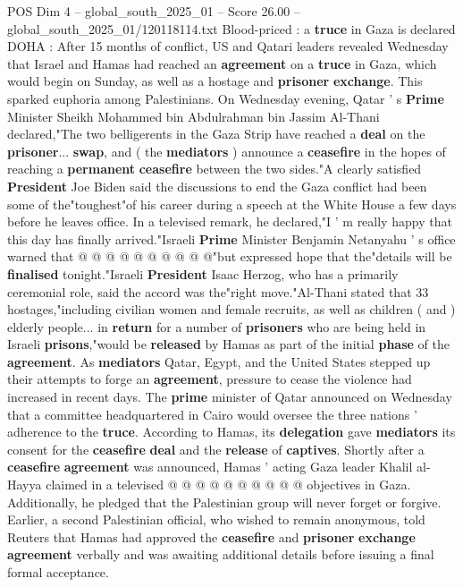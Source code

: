 \begin{textsample}{POS Dim 4 – global\_south\_2025\_01 – Score 26.00 – global\_south\_2025\_01/120118114.txt}  \label{ex:f4_pos_012}
Blood-priced : a \textbf{truce} in Gaza is declared DOHA : After 15 months of conflict, US and Qatari leaders revealed Wednesday that Israel and Hamas had reached an \textbf{agreement} on a \textbf{truce} in Gaza, which would begin on Sunday, as well as a hostage and \textbf{prisoner} \textbf{exchange}.
This sparked euphoria among Palestinians.
On Wednesday evening, Qatar ' s \textbf{Prime} Minister Sheikh Mohammed bin Abdulrahman bin Jassim Al-Thani declared,"The two belligerents in the Gaza Strip have reached a \textbf{deal} on the \textbf{prisoner}... \textbf{swap}, and ( the \textbf{mediators} ) announce a \textbf{ceasefire} in the hopes of reaching a \textbf{permanent} \textbf{ceasefire} between the two sides."A clearly satisfied \textbf{President} Joe Biden said the discussions to end the Gaza conflict had been some of the"toughest"of his career during a speech at the White House a few days before he leaves office.
In a televised remark, he declared,"I ' m really happy that this day has finally arrived."Israeli \textbf{Prime} Minister Benjamin Netanyahu ' s office warned that @ @ @ @ @ @ @ @ @ @"but expressed hope that the"details will be \textbf{finalised} tonight."Israeli \textbf{President} Isaac Herzog, who has a primarily ceremonial role, said the accord was the"right move."Al-Thani stated that 33 hostages,"including civilian women and female recruits, as well as children ( and ) elderly people... in \textbf{return} for a number of \textbf{prisoners} who are being held in Israeli \textbf{prisons},"would be \textbf{released} by Hamas as part of the initial \textbf{phase} of the \textbf{agreement}.
As \textbf{mediators} Qatar, Egypt, and the United States stepped up their attempts to forge an \textbf{agreement}, pressure to cease the violence had increased in recent days.
The \textbf{prime} minister of Qatar announced on Wednesday that a committee headquartered in Cairo would oversee the three nations ' adherence to the \textbf{truce}.
According to Hamas, its \textbf{delegation} gave \textbf{mediators} its consent for the \textbf{ceasefire} \textbf{deal} and the \textbf{release} of \textbf{captives}.
Shortly after a \textbf{ceasefire} \textbf{agreement} was announced, Hamas ' acting Gaza leader Khalil al-Hayya claimed in a televised @ @ @ @ @ @ @ @ @ @ objectives in Gaza.
Additionally, he pledged that the Palestinian group will never forget or forgive.
Earlier, a second Palestinian official, who wished to remain anonymous, told Reuters that Hamas had approved the \textbf{ceasefire} and \textbf{prisoner} \textbf{exchange} \textbf{agreement} verbally and was awaiting additional details before issuing a final formal acceptance.

\end{textsample}
